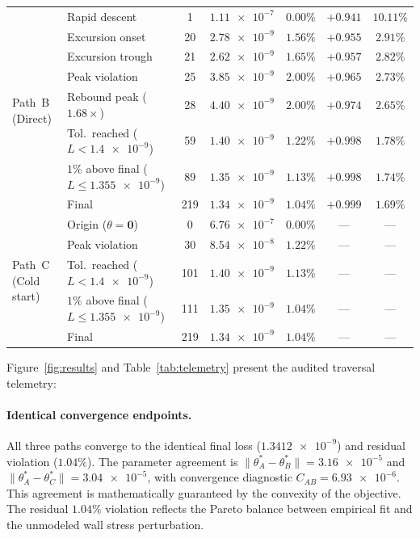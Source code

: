 \documentclass[preprint,aps,prb,longbibliography,superscriptaddress]{revtex4-2}
\begin{document}
\begin{table}[t]
\begin{ruledtabular}
\begin{tabular}{llccccc}
  \midrule
  \multirow{8}{*}{Path~B (Direct)}
    & Rapid descent & 1 & $\num{1.11e-7}$ & $0.00\%$ & $+0.941$ & $10.11\%$ \\
    & Excursion onset & 20 & $\num{2.78e-9}$ & $1.56\%$ & $+0.955$ & $2.91\%$ \\
    & Excursion trough & 21 & $\num{2.62e-9}$ & $1.65\%$ & $+0.957$ & $2.82\%$ \\
    & Peak violation & 25 & $\num{3.85e-9}$ & $2.00\%$ & $+0.965$ & $2.73\%$ \\
    & Rebound peak ($1.68\times$) & 28 & $\num{4.40e-9}$ & $2.00\%$ & $+0.974$ & $2.65\%$ \\
    & Tol.\ reached ($L < \num{1.4e-9}$) & 59 & $\num{1.40e-9}$ & $1.22\%$ & $+0.998$ & $1.78\%$ \\
    & $1\%$ above final ($L \le \num{1.355e-9}$) & 89 & $\num{1.35e-9}$ & $1.13\%$ & $+0.998$ & $1.74\%$ \\
    & Final & 219 & $\num{1.34e-9}$ & $1.04\%$ & $+0.999$ & $1.69\%$ \\
  \midrule
  \multirow{5}{*}{Path~C (Cold start)}
    & Origin ($\theta = \mathbf{0}$) & 0 & $\num{6.76e-7}$ & $0.00\%$ & --- & --- \\
    & Peak violation & 30 & $\num{8.54e-8}$ & $1.22\%$ & --- & --- \\
    & Tol.\ reached ($L < \num{1.4e-9}$) & 101 & $\num{1.40e-9}$ & $1.13\%$ & --- & --- \\
    & $1\%$ above final ($L \le \num{1.355e-9}$) & 111 & $\num{1.35e-9}$ & $1.04\%$ & --- & --- \\
    & Final & 219 & $\num{1.34e-9}$ & $1.04\%$ & --- & --- \\
\end{tabular}
\end{ruledtabular}
\end{table}

Figure~\ref{fig:results} and Table~\ref{tab:telemetry} present the audited
traversal telemetry:

\paragraph{Identical convergence endpoints.}
All three paths converge to the identical final loss ($\num{1.3412e-9}$) and
residual violation ($1.04\%$). The parameter agreement is
$\|\theta_A^* - \theta_B^*\| = \num{3.16e-5}$ and
$\|\theta_A^* - \theta_C^*\| = \num{3.04e-5}$, with convergence diagnostic
$C_{AB} = \num{6.93e-6}$. This agreement is mathematically guaranteed by the
convexity of the objective. The residual $1.04\%$ violation reflects the
Pareto balance between empirical fit and the unmodeled wall stress perturbation.
\end{document}
